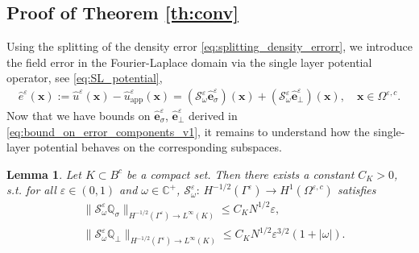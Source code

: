 \documentclass[]{article}
\newtheorem{lemma}{Lemma}
\numberwithin{equation}{section}
\numberwithin{theorem}{section}
\numberwithin{lemma}{section}
\numberwithin{corollary}{section}
\numberwithin{proposition}{section}
\numberwithin{definition}{section}
\newcommand{\bx}{\boldsymbol{x}}
\newcommand{\re}{\varepsilon}
\renewcommand{\vec}{\boldsymbol}
\begin{document}
	\subsection{Proof of Theorem \ref{th:conv}}
	\label{sec:fd_bounds}
	Using the splitting of the density error \eqref{eq:splitting_density_errorr}, we introduce the field error in the Fourier-Laplace domain via the single layer potential operator, see \eqref{eq:SL_potential},  
	\begin{align}%
		\label{eq:urex}
		\hat{e}^{\re}(\boldsymbol{x}):=	\hat{u}^{\re}(\boldsymbol{x}) - \hat{u}^{\re}_{\operatorname{app}}(\boldsymbol{x}) =  (\mathcal{S}^{\re}_{\omega} \hat{\vec{e}}^{\re}_{\sigma})(\bx) + (\mathcal{S}^{\re}_{\omega} \hat{\vec{e}}^{\re}_{\perp})(\bx), \quad \bx \in \Omega^{\re,c}.
	\end{align}
	Now that we have bounds on $\hat{\vec{e}}^{\re}_{\sigma}$, $\hat{\vec{e}}^{\re}_{\perp}$ derived in  \eqref{eq:bound_on_error_components_v1}, it remains to understand how the single-layer potential behaves on the corresponding subspaces. 
	\begin{lemma}
		\label{lem:slp}
		Let $K\subset B^c$ be a compact set. Then there exists a constant $C_K>0$, s.t. for all $\re \in (0,1)$ and $\omega \in \mathbb{C}^+$, $\mathcal{S}^{\re}_{\omega}: \, H^{-1/2}(\Gamma^{\re})\rightarrow H^{1}(\Omega^{\re,c})$ satisfies
		\begin{align}%
			\label{eq:s1}
			&\|\mathcal{S}^{\re}_{\omega}\mathbb{Q}_{\sigma}\|_{H^{-1/2}(\Gamma^{\re})\rightarrow L^{\infty}(K)}\leq C_KN^{1/2}\re,\\
			\label{eq:s2}
			&\|\mathcal{S}^{\re}_{\omega}\mathbb{Q}_{\perp}\|_{H^{-1/2}(\Gamma^{\re})\rightarrow L^{\infty}(K)}\leq C_KN^{1/2}\re^{3/2}(1+|\omega|).
		\end{align}
	\end{lemma}
\end{document}
